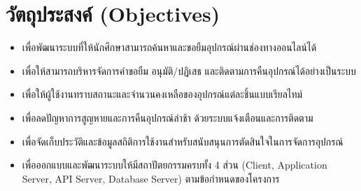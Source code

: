 \section{วัตถุประสงค์ (Objectives)}

\begin{itemize}
  \item เพื่อพัฒนาระบบที่ให้นักศึกษาสามารถค้นหาและขอยืมอุปกรณ์ผ่านช่องทางออนไลน์ได้
  \item เพื่อให้สามารถบริหารจัดการคำขอยืม อนุมัติ/ปฏิเสธ และติดตามการคืนอุปกรณ์ได้อย่างเป็นระบบ
  \item เพื่อให้ผู้ใช้งานทราบสถานะและจำนวนคงเหลือของอุปกรณ์แต่ละชิ้นแบบเรียลไทม์
  \item เพื่อลดปัญหาการสูญหายและการคืนอุปกรณ์ล่าช้า ด้วยระบบแจ้งเตือนและการติดตาม
  \item เพื่อจัดเก็บประวัติและข้อมูลสถิติการใช้งานสำหรับสนับสนุนการตัดสินใจในการจัดการอุปกรณ์
  \item เพื่อออกแบบและพัฒนาระบบให้มีสถาปัตยกรรมครบทั้ง 4 ส่วน (Client, Application Server, API Server, Database Server) ตามข้อกำหนดของโครงการ
\end{itemize}
